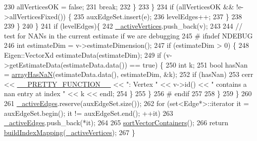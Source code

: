 \begin{DoxyCode}
230               allVerticesOK = \textcolor{keyword}{false};
231               \textcolor{keywordflow}{break};
232             \}
233           \}
234           \textcolor{keywordflow}{if} (allVerticesOK && !e->allVerticesFixed()) \{
235             auxEdgeSet.insert(e);
236             levelEdges++;
237           \}
238 
239         \}
240       \}
241       \textcolor{keywordflow}{if} (levelEdges)\{
242         \hyperlink{classg2o_1_1SparseOptimizer_a805e1db97802980fa4dfef95cfa5e63e}{\_activeVertices}.push\_back(v);
243 
244         \textcolor{comment}{// test for NANs in the current estimate if we are debugging}
245 \textcolor{preprocessor}{#      ifndef NDEBUG}
246         \textcolor{keywordtype}{int} estimateDim = v->estimateDimension();
247         \textcolor{keywordflow}{if} (estimateDim > 0) \{
248           Eigen::VectorXd estimateData(estimateDim);
249           \textcolor{keywordflow}{if} (v->getEstimateData(estimateData.data()) == \textcolor{keyword}{true}) \{
250             \textcolor{keywordtype}{int} k;
251             \textcolor{keywordtype}{bool} hasNan = \hyperlink{namespaceg2o_a123840a60e0d1dde58088d15a1e1fffa}{arrayHasNaN}(estimateData.data(), estimateDim, &k);
252             \textcolor{keywordflow}{if} (hasNan)
253               cerr << \hyperlink{macros_8h_a9c15fe1e91b07ea3280f5239f9841b67}{\_\_PRETTY\_FUNCTION\_\_} << \textcolor{stringliteral}{": Vertex "} << v->id() << \textcolor{stringliteral}{" contains a nan
       entry at index "} << k << endl;
254           \}
255         \}
256 \textcolor{preprocessor}{#      endif}
257 
258       \}
259     \}
260 
261     \hyperlink{classg2o_1_1SparseOptimizer_a3207df163943bc1672fc7872964a6d6c}{\_activeEdges}.reserve(auxEdgeSet.size());
262     \textcolor{keywordflow}{for} (set<Edge*>::iterator it = auxEdgeSet.begin(); it != auxEdgeSet.end(); ++it)
263       \hyperlink{classg2o_1_1SparseOptimizer_a3207df163943bc1672fc7872964a6d6c}{\_activeEdges}.push\_back(*it);
264 
265     \hyperlink{classg2o_1_1SparseOptimizer_a8a8c6f08bc9b8a4e520aa73198268991}{sortVectorContainers}();
266     \textcolor{keywordflow}{return} \hyperlink{classg2o_1_1SparseOptimizer_a8c6af9785e85153ade1490beacad73ce}{buildIndexMapping}(\hyperlink{classg2o_1_1SparseOptimizer_a805e1db97802980fa4dfef95cfa5e63e}{\_activeVertices});
267   \}
\end{DoxyCode}
